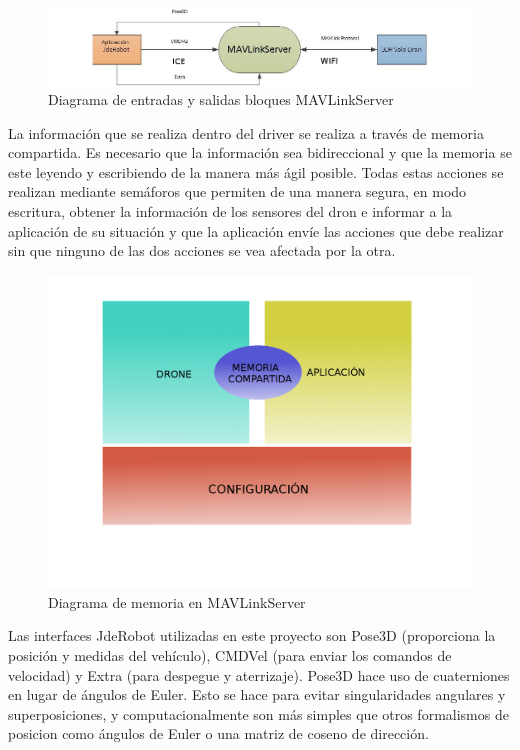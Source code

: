 \begin{figure}[H]
  \centering
  \includegraphics[scale=0.65]{imagenes/cajaNegraNueva.png}
  \caption{Diagrama de entradas y salidas bloques MAVLinkServer}
  \label{fig:mavLinkJdeRobotNegra}
\end{figure}

La información que se realiza dentro del driver se realiza a través de memoria compartida. Es necesario que la información sea bidireccional y que la memoria se este leyendo y escribiendo de la manera más ágil posible. Todas estas acciones se realizan mediante semáforos que permiten de una manera segura, en modo escritura, obtener la información de los sensores del dron e informar a la aplicación de su situación y que la aplicación envíe las acciones que debe realizar sin que ninguno de las dos acciones se vea afectada por la otra.

\begin{figure}[H]
  \centering
  \includegraphics[scale=0.2]{imagenes/MEMORIACOMPARTIDA.png}
  \caption{Diagrama de memoria en MAVLinkServer}
  \label{fig:memoriaCompartida}
\end{figure}

Las interfaces JdeRobot utilizadas en este proyecto son Pose3D (proporciona la posición y medidas del vehículo), CMDVel (para enviar los comandos de velocidad) y Extra (para despegue y aterrizaje). Pose3D hace uso de cuaterniones en lugar de ángulos de Euler. Esto se hace para evitar singularidades angulares y superposiciones, y computacionalmente son más simples que otros formalismos de posicion como ángulos de Euler o una matriz de coseno de dirección.


